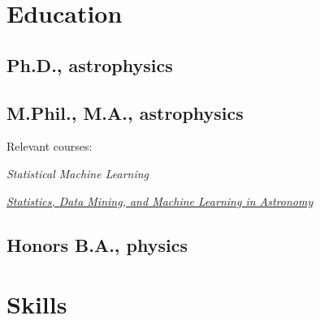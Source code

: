 \documentclass[letterpaper,12pt]{deedy-resume} %
\begin{document}
\begin{minipage}[t]{0.32\textwidth} %


\section{Education}

\subsection{Ph.D., astrophysics}

\sectionspace %

\subsection{M.Phil., M.A., astrophysics}
\begin{tighteritemize}
    \item Relevant courses: 
    \item \textit{Statistical Machine Learning} 
    \item \textit{\href{https://github.com/adrn/NYCastroML}{Statistics, Data Mining, and Machine Learning in Astronomy}}
\end{tighteritemize}

\sectionspace %

\subsection{Honors B.A., physics}

\sectionspace %


\section{Skills}


\end{minipage}
\end{document}
